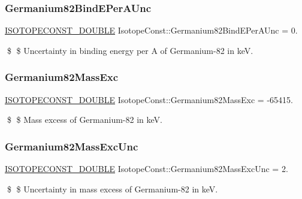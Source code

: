 \subsubsection{\texorpdfstring{Germanium82\+Bind\+E\+Per\+A\+Unc}{Germanium82BindEPerAUnc}}
{\footnotesize\ttfamily \mbox{\hyperlink{group___isotope_const-_macros_ga8f45a7272ce02c0b4c65c44636ed719a}{I\+S\+O\+T\+O\+P\+E\+C\+O\+N\+S\+T\+\_\+\+D\+O\+U\+B\+LE}} Isotope\+Const\+::\+Germanium82\+Bind\+E\+Per\+A\+Unc = 0.}

\$ \$ Uncertainty in binding energy per A of Germanium-\/82 in keV. \mbox{\label{group___isotope_const-_germanium-_ge82_gac16841cc905ba9cc4cfad70a1620436b}} 
\subsubsection{\texorpdfstring{Germanium82\+Mass\+Exc}{Germanium82MassExc}}
{\footnotesize\ttfamily \mbox{\hyperlink{group___isotope_const-_macros_ga8f45a7272ce02c0b4c65c44636ed719a}{I\+S\+O\+T\+O\+P\+E\+C\+O\+N\+S\+T\+\_\+\+D\+O\+U\+B\+LE}} Isotope\+Const\+::\+Germanium82\+Mass\+Exc = -\/65415.}

\$ \$ Mass excess of Germanium-\/82 in keV. \mbox{\label{group___isotope_const-_germanium-_ge82_ga096228b2d6779c81da5ed9b6ab389aaf}} 
\subsubsection{\texorpdfstring{Germanium82\+Mass\+Exc\+Unc}{Germanium82MassExcUnc}}
{\footnotesize\ttfamily \mbox{\hyperlink{group___isotope_const-_macros_ga8f45a7272ce02c0b4c65c44636ed719a}{I\+S\+O\+T\+O\+P\+E\+C\+O\+N\+S\+T\+\_\+\+D\+O\+U\+B\+LE}} Isotope\+Const\+::\+Germanium82\+Mass\+Exc\+Unc = 2.}

\$ \$ Uncertainty in mass excess of Germanium-\/82 in keV. \mbox{\label{group___isotope_const-_germanium-_ge82_ga4dca4e139714558fc0c71114b3ff4063}} 
